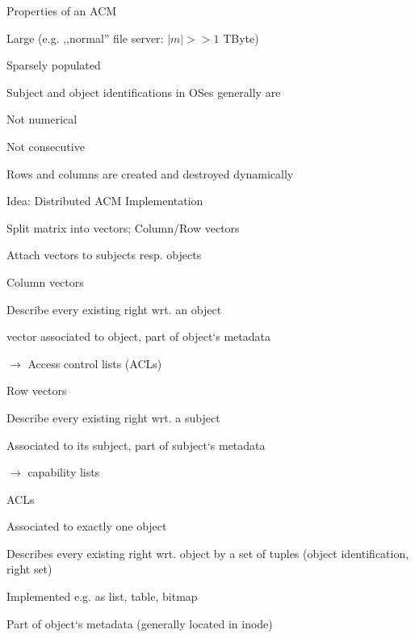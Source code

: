\documentclass[a4paper]{article}
\begin{document}
\begin{multicols}{3}
    Properties of an ACM
    \begin{itemize*}
        \item Large (e.g. ,,normal'' file server: $|m| >> 1$ TByte)
        \item Sparsely populated
        \item Subject and object identifications in OSes generally are
        \begin{itemize*}
            \item Not numerical
            \item Not consecutive
        \end{itemize*}
        \item Rows and columns are created and destroyed dynamically
    \end{itemize*}

    Idea: Distributed ACM Implementation
    \begin{enumerate*}
        \item Split matrix into vectors; Column/Row vectors
        \item Attach vectors to subjects resp. objects
    \end{enumerate*}
    \begin{itemize*}
        \item Column vectors
        \begin{itemize*}
            \item Describe every existing right wrt. an object
            \item vector associated to object, part of object‘s metadata
            \item[$\rightarrow$] Access control lists (ACLs)
        \end{itemize*}
        \item Row vectors
        \begin{itemize*}
            \item Describe every existing right wrt. a subject
            \item Associated to its subject, part of subject‘s metadata
            \item[$\rightarrow$] capability lists
        \end{itemize*}
    \end{itemize*}

    ACLs
    \begin{itemize*}
        \item Associated to exactly one object
        \item Describes every existing right wrt. object by a set of tuples (object identification, right set)
        \item Implemented e.g. as list, table, bitmap
        \item Part of object‘s metadata (generally located in inode)
    \end{itemize*}


\end{multicols}
\end{document}
